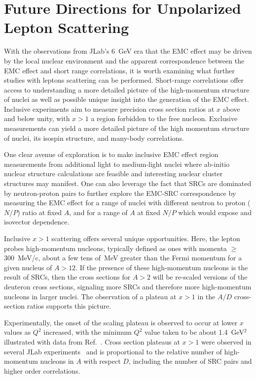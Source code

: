 \section{Future Directions for Unpolarized Lepton Scattering\label{sec:directions}}

With the observations from JLab's 6~GeV era that the EMC effect may be driven by the local nuclear environment
and the apparent correspondence between the EMC effect and short range correlations, it is worth examining what
further studies with leptons scattering can be performed.
Short-range correlations offer access to understanding a more detailed picture of the high-momentum structure of nuclei as well as possible unique insight into the generation of the EMC effect.  Inclusive experiments aim to measure precision cross section ratios at $x$ above and below unity, with $x > 1$ a region forbidden to the free nucleon.  Exclusive measurements can yield a more detailed picture of the high momentum structure of nuclei, its isospin structure, and many-body correlations.


One clear avenue of exploration is to make inclusive EMC effect region measurements from additional light to medium-light
nuclei where ab-initio nuclear structure calculations are feasible and interesting nuclear cluster
structures may manifest.  One can also leverage the fact that SRCs are dominated by neutron-proton pairs to further explore
the EMC-SRC correspondence by measuring the EMC effect for a range of nuclei with
different neutron to proton ($N/P$) ratio at fixed $A$, and for a range of $A$ at fixed $N/P$ which would
expose and isovector dependence.

Inclusive $x>1$ scattering offers several unique opportunities.  Here, the lepton probes high-momentum nucleons, typically defined as ones with momenta $\ge$300~MeV/c, about a few tens of~MeV greater than the Fermi momentum for a given nucleus of $A>12$.  If the presence of these high-momentum nucleons is the result of SRCs, then the cross sections for $A>2$ will be re-scaled versions of the deuteron cross sections, signaling more SRCs and therefore more high-momentum nucleons in larger nuclei.   The observation of a plateau at $x>1$ in the $A/D$ cross-section ratios supports this picture. 

 Experimentally, the onset of the scaling plateau is observed to occur at lower $x$ values as $Q^2$ increased, with the minimum $Q^2$ value taken to be about 1.4~GeV$^2$ illustrated with data from Ref.~\cite{Egiyan:2003vg}.  Cross section plateaus at $x>1$ were observed in several JLab experiments~\cite{Egiyan:2003vg, Fomin:2011ng} and is proportional to the relative number of high-momentum nucleons in $A$ with respect $D$, including the number of SRC pairs and higher order correlations.   %

